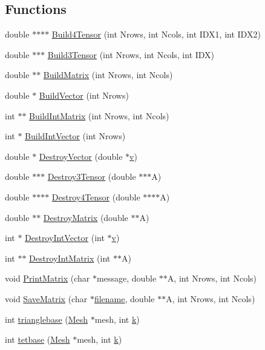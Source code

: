 \subsection*{Functions}
\begin{DoxyCompactItemize}
\item 
double $\ast$$\ast$$\ast$$\ast$ \hyperlink{a00602_a745a480f3faf250c87406ddb1d8d0e4f}{Build4\+Tensor} (int Nrows, int Ncols, int I\+D\+X1, int I\+D\+X2)
\item 
double $\ast$$\ast$$\ast$ \hyperlink{a00602_a6031ee45d6b3d95665a885b7128c311c}{Build3\+Tensor} (int Nrows, int Ncols, int I\+DX)
\item 
double $\ast$$\ast$ \hyperlink{a00602_a4bf6e503687187059ced10b812beaab3}{Build\+Matrix} (int Nrows, int Ncols)
\item 
double $\ast$ \hyperlink{a00602_a990278305dbeaf8e4441cf4146bfdc62}{Build\+Vector} (int Nrows)
\item 
int $\ast$$\ast$ \hyperlink{a00602_a77f751d54b396015520a882d7a318e57}{Build\+Int\+Matrix} (int Nrows, int Ncols)
\item 
int $\ast$ \hyperlink{a00602_a0f24d8056fa979af4888469ea90576ff}{Build\+Int\+Vector} (int Nrows)
\item 
double $\ast$ \hyperlink{a00602_a80d1cd97ff27b4af78dcae4720b12ec2}{Destroy\+Vector} (double $\ast$\hyperlink{a00605_ac4055e3a20b6b3af3d10590ea446ef6c}{v})
\item 
double $\ast$$\ast$$\ast$ \hyperlink{a00602_a44d9724ffbc5b6937b622948003b9237}{Destroy3\+Tensor} (double $\ast$$\ast$$\ast$A)
\item 
double $\ast$$\ast$$\ast$$\ast$ \hyperlink{a00602_a622db7bf01e187334349001f44f29b8a}{Destroy4\+Tensor} (double $\ast$$\ast$$\ast$$\ast$A)
\item 
double $\ast$$\ast$ \hyperlink{a00602_a93ff2c99f019051b3cdeba84fd798332}{Destroy\+Matrix} (double $\ast$$\ast$A)
\item 
int $\ast$ \hyperlink{a00602_a77ea0d4c74ea8c7599ebe5c15ecbb7fa}{Destroy\+Int\+Vector} (int $\ast$\hyperlink{a00605_ac4055e3a20b6b3af3d10590ea446ef6c}{v})
\item 
int $\ast$$\ast$ \hyperlink{a00602_a60e426d6cf7506409d3d88171c1335fb}{Destroy\+Int\+Matrix} (int $\ast$$\ast$A)
\item 
void \hyperlink{a00602_a75942b12ae1b0172595c4d482b8203c0}{Print\+Matrix} (char $\ast$message, double $\ast$$\ast$A, int Nrows, int Ncols)
\item 
void \hyperlink{a00602_ac376677d3caaa98a9daf61674a973d1b}{Save\+Matrix} (char $\ast$\hyperlink{a00623_a42a21beb8018ac623f4d09db1343b9cf}{filename}, double $\ast$$\ast$A, int Nrows, int Ncols)
\item 
int \hyperlink{a00602_ae80676d4366a8214050e9ee665b94563}{trianglebase} (\hyperlink{a00557_aeffbe0891ab73a4d8964c9cb7978426e}{Mesh} $\ast$mesh, int \hyperlink{a00605_a6086917dfee54d84abe1838505c8cf69}{k})
\item 
int \hyperlink{a00602_aab0b0f793509896cdcfaa0b143acd8e8}{tetbase} (\hyperlink{a00557_aeffbe0891ab73a4d8964c9cb7978426e}{Mesh} $\ast$mesh, int \hyperlink{a00605_a6086917dfee54d84abe1838505c8cf69}{k})
\end{DoxyCompactItemize}


